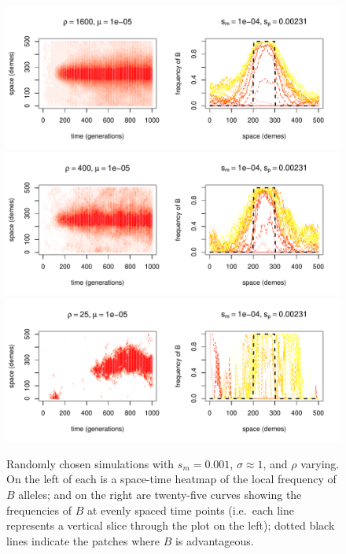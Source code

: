 \documentclass{article}
\begin{document}
\begin{figure}
  \begin{center}
    \includegraphics{example-mutation-sims/15449-r1-501-sb0_01-sm-1e-04-N1600-pophistory-run}
    \includegraphics{example-mutation-sims/5582-r1-501-sb0_01-sm-1e-04-N400-pophistory-run}
    \includegraphics{example-mutation-sims/24639-r1-501-sb0_01-sm-1e-04-N25-pophistory-run}
  \end{center}
  \caption{
    Randomly chosen simulations with $s_m=0.001$, $\sigma\approx 1$, and $\rho$ varying.
    On the left of each is a space-time heatmap of the local frequency of $B$ alleles;
    and on the right are twenty-five curves showing the frequencies of $B$ at evenly spaced time points
    (i.e.\ each line represents a vertical slice through the plot on the left);
    dotted black lines indicate the patches where $B$ is advantageous.
  } \label{sfig:sims_4}
\end{figure}
\end{document}
